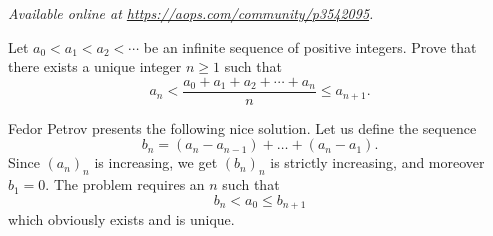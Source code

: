 \textsl{Available online at \url{https://aops.com/community/p3542095}.}
\begin{mdframed}[style=mdpurplebox,frametitle={Problem statement}]
Let $a_0 < a_1 < a_2 < \dotsb$ be an infinite sequence of positive integers.
Prove that there exists a unique integer $n\geq 1$ such that
\[ a_n < \frac{a_0+a_1+a_2+\dotsb+a_n}{n} \le a_{n+1}. \]
\end{mdframed}
Fedor Petrov presents the following nice solution.
Let us define the sequence
\[ b_n = \left( a_n - a_{n-1} \right) + \dots + \left( a_n - a_1 \right). \]
Since $(a_n)_n$ is increasing, we get $(b_n)_n$ is strictly increasing,
and moreover $b_1 = 0$.
The problem requires an $n$ such that
\[ b_n < a_0 \le b_{n+1} \]
which obviously exists and is unique.
\pagebreak